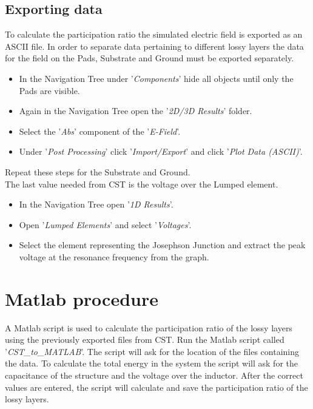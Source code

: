 \subsection{Exporting data}
To calculate the participation ratio the simulated electric field is exported as an ASCII file. In order to separate data pertaining to different lossy layers the data for the field on the Pads, Substrate and Ground must be exported separately. 
\begin{itemize}
	\item In the Navigation Tree under '\textit{Components}' hide all objects until only the Pads are visible.
	\item Again in the Navigation Tree open the '\textit{2D/3D Results}' folder.
	\item Select the '\textit{Abs}' component of the '\textit{E-Field}'.
	\item Under '\textit{Post Processing}' click '\textit{Import/Export}' and click '\textit{Plot Data (ASCII)}'. 
\end{itemize}
Repeat these steps for the Substrate and Ground. \\
The last value needed from CST is the voltage over the Lumped element.
\begin{itemize}
	\item In the Navigation Tree open '\textit{1D Results}'.
	\item Open '\textit{Lumped Elements}' and select '\textit{Voltages}'.
	\item Select the element representing the Josephson Junction and extract the peak voltage at the resonance frequency from the graph.   
\end{itemize}

\section{Matlab procedure}
A Matlab script is used to calculate the participation ratio of the lossy layers using the previously exported files from CST. Run the Matlab script called '\textit{CST\_to\_MATLAB}'. The script will ask for the location of the files containing the data. To calculate the total energy in the system the script will ask for the capacitance of the structure and the voltage over the inductor. After the correct values are entered, the script will calculate and save the participation ratio of the lossy layers. 